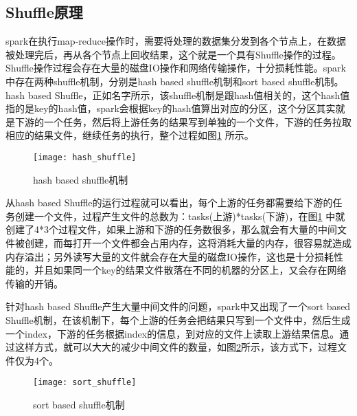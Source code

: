 \subsection{Shuffle原理}
spark在执行map-reduce操作时，需要将处理的数据集分发到各个节点上，在数据被处理完后，再从各个节点上回收结果，这个就是一个具有Shuffle操作的过程。Shuffle操作过程会存在大量的磁盘IO操作和网络传输操作，十分损耗性能。spark中存在两种shuffle机制，分别是hash based shuffle机制和sort based shuffle机制。hash based Shuffle，正如名字所示，该shuffle机制是跟hash值相关的，这个hash值指的是key的hash值，spark会根据key的hash值算出对应的分区，这个分区其实就是下游的一个任务，然后将上游任务的结果写到单独的一个文件，下游的任务拉取相应的结果文件，继续任务的执行，整个过程如图\ref{fig:hash_shuffle} 所示。
\begin{figure}[htp]
\centering
\texttt{[image: hash\_shuffle]}
\caption{hash based shuffle机制}
\label{fig:hash_shuffle}
\end{figure}

从hash based Shuffle的运行过程就可以看出，每个上游的任务都需要给下游的任务创建一个文件，过程产生文件的总数为：tasks(上游)*tasks(下游)，在图\ref{fig:hash_shuffle} 中就创建了4*3个过程文件，如果上游和下游的任务数很多，那么就会有大量的中间文件被创建，而每打开一个文件都会占用内存，这将消耗大量的内存，很容易就造成内存溢出；另外读写大量的文件就会存在大量的磁盘IO操作，这也是十分损耗性能的，并且如果同一个key的结果文件散落在不同的机器的分区上，又会存在网络传输的开销。

针对hash based Shuffle产生大量中间文件的问题，spark中又出现了一个sort based Shuffle机制，在该机制下，每个上游的任务会把结果只写到一个文件中，然后生成一个index，下游的任务根据index的信息，到对应的文件上读取上游结果信息。通过这样方式，就可以大大的减少中间文件的数量，如图\ref{fig:sort_shuffle}所示，该方式下，过程文件仅为4个。
\begin{figure}[htp]
\centering
\texttt{[image: sort\_shuffle]}
\caption{sort based shuffle机制}
\label{fig:sort_shuffle}
\end{figure}

